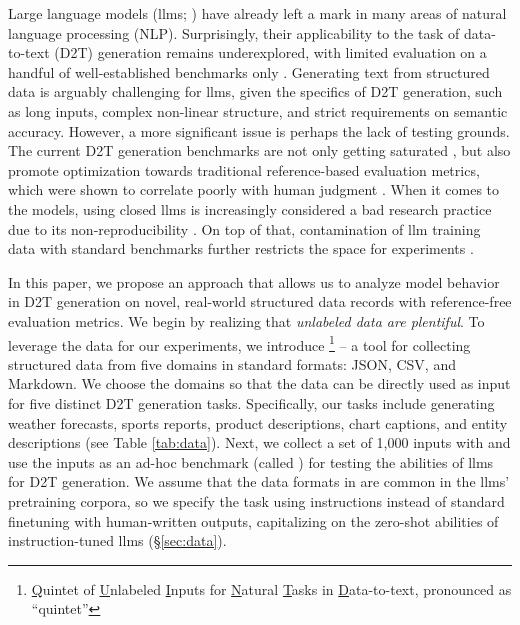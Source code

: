 Large language models (\acp{llm}; \citealp{ouyang2022TrainingLM,touvron2023llama,touvronLlamaOpenFoundation2023,jiangMistral7B2023,tunstallZephyrDirectDistillation2023}) have already left a mark in many areas of natural language processing (NLP). Surprisingly, their applicability to the task of data-to-text (D2T) generation \cite{reiter1997building,gatt2018survey} remains underexplored, with limited evaluation on a handful of well-established benchmarks only \cite{axelssonUsingLargeLanguage2023,yuanEvaluatingGenerativeModels2023}. Generating text from structured data is arguably challenging for \acp{llm}, given the specifics of D2T generation, such as long inputs, complex non-linear structure, and strict requirements on semantic accuracy. However, a more significant issue is perhaps the lack of testing grounds. The current D2T generation benchmarks are not only getting saturated \cite{vanmiltenburgBarriersEnablingFactors2023}, but also promote optimization towards traditional reference-based evaluation metrics, which were shown to correlate poorly with human judgment \cite{gehrmann2022repairing,vanderleeHumanEvaluationAutomatically2021,novikovaWhyWeNeed2017}. When it comes to the models, using closed \acp{llm} \cite{openai2023gpt4,chatgpt} is increasingly considered a bad research practice due to its non-reproducibility \cite{rogers2023closed,chen2023chatgpt}. On top of that, contamination of \ac{llm} training data with standard benchmarks further restricts the space for experiments \cite{golchin2023time,aiyappa-etal-2023-trust,balloccu2024leak}.


In this paper, we propose an approach that allows us to analyze model behavior in D2T generation on novel, real-world structured data records with reference-free evaluation metrics. We begin by realizing that \textit{unlabeled data are plentiful}. To leverage the data for our experiments, we introduce \datatool\footnote{\underline{Q}uintet of \underline{U}nlabeled \underline{I}nputs for \underline{N}atural \underline{T}asks in \underline{D}ata-to-text, pronounced as ``quintet''} -- a tool for collecting structured data from five domains in standard formats: JSON,
CSV,
and Markdown.
We choose the domains so that the data can be directly used as input for five distinct D2T generation tasks. Specifically, our tasks include generating weather forecasts, sports reports, product descriptions, chart captions, and entity descriptions (see Table \ref{tab:data}).
%
Next, we collect a set of 1,000 inputs with \datatool and use the inputs as an ad-hoc benchmark (called \benchmark) for testing the abilities of \acp{llm} for D2T generation. We assume that the data formats in \benchmark are common in the \acp{llm}' pretraining corpora, so we specify the task using instructions instead of standard finetuning with human-written outputs, capitalizing on the zero-shot abilities of instruction-tuned \acp{llm} (§\ref{sec:data}).


